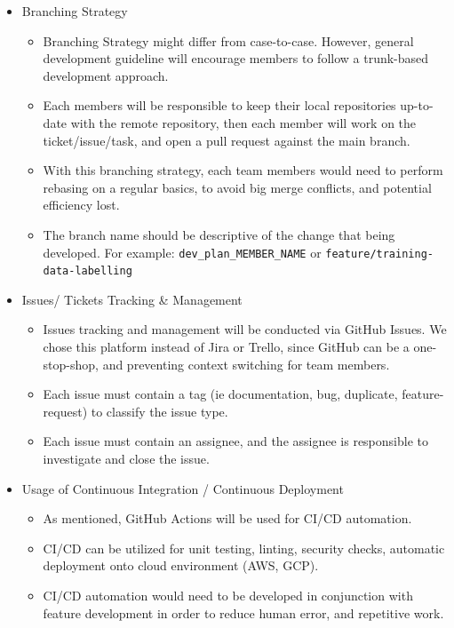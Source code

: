 \documentclass{article}
\begin{document}
\begin{itemize}
  \item Branching Strategy
  \begin{itemize}
    \item Branching Strategy might differ from case-to-case. However, general development guideline will encourage members to follow a trunk-based development approach.
    \item Each members will be responsible to keep their local repositories up-to-date with the remote repository, then each member will work on the ticket/issue/task, and open a pull request against the main branch.
    \item With this branching strategy, each team members would need to perform rebasing on a regular basics, to avoid big merge conflicts, and potential efficiency lost. 
    \item The branch name should be descriptive of the change that being developed. For example: \texttt{dev\_plan\_MEMBER\_NAME} or \texttt{feature/training-data-labelling}

  \end{itemize}
	
	\item Issues/ Tickets Tracking \& Management
  \begin{itemize}
    \item Issues tracking and management will be conducted via GitHub Issues. We chose this platform instead of Jira or Trello, since GitHub can be a one-stop-shop, and preventing context switching for team members.
    \item Each issue must contain a tag (ie documentation, bug, duplicate, feature-request) to classify the issue type.
    \item Each issue must contain an assignee, and the assignee is responsible to investigate and close the issue.
  \end{itemize}

  \item Usage of Continuous Integration / Continuous Deployment
  \begin{itemize}
    \item As mentioned, GitHub Actions will be used for CI/CD automation.
    \item CI/CD can be utilized for unit testing, linting, security checks, automatic deployment onto cloud environment (AWS, GCP).
    \item CI/CD automation would need to be developed in conjunction with feature development in order to reduce human error, and repetitive work.
  \end{itemize}

\end{itemize}
\end{document}
